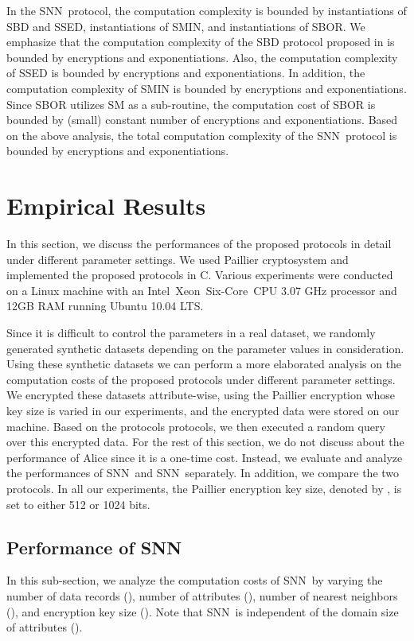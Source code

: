 \documentclass{article}
\newcommand{\sknnb}{SNN}
\newcommand{\sknnm}{SNN}
\begin{document}
In the \sknnm~protocol, the computation complexity is bounded by  
instantiations of SBD and SSED,  instantiations of SMIN, and  instantiations 
of SBOR. We emphasize that the computation complexity of the SBD protocol 
proposed in \cite{bksam-asiaccs13} is bounded by  encryptions and  exponentiations. 
Also, the computation complexity of SSED is bounded by  encryptions and  exponentiations. In 
addition, the computation complexity of SMIN is bounded by  encryptions 
and  exponentiations. Since SBOR utilizes SM as a sub-routine, 
the computation cost of SBOR is bounded by (small) constant number of encryptions and exponentiations. 
Based on the above analysis, the total computation complexity of the \sknnm~protocol 
is bounded by  
encryptions and exponentiations.
 

\section{Empirical Results} \label{sec:exp}
In this section, we discuss the  
performances of the proposed protocols in detail under different parameter settings. 
We used Paillier cryptosystem\cite{paillier-99} 
and implemented the proposed protocols in C. Various experiments 
were conducted on a Linux machine with an 
Intel\textregistered~Xeon\textregistered~Six-Core\texttrademark~CPU 3.07 GHz 
processor and 12GB RAM running Ubuntu 10.04 LTS. 


Since it is difficult to control the parameters in a real dataset, 
we randomly generated synthetic datasets depending on the parameter values in consideration. 
Using these synthetic datasets we can  
perform a more elaborated analysis on the computation costs of the proposed protocols under different 
parameter settings. 
We encrypted these datasets attribute-wise, using the Paillier encryption 
whose key size is varied in our experiments, and the encrypted data were
stored on our machine. Based on the protocols protocols, we then 
executed a random query over this encrypted data. For the rest 
of this section, we do not discuss about the performance of Alice 
since it is a one-time cost. Instead, we evaluate 
and analyze the performances of \sknnb~and \sknnm~separately. In addition, 
we compare the two protocols. In all our experiments, the Paillier 
encryption key size, denoted by , is set to either 512 or 1024 bits.


\subsection{Performance of \sknnb} 
In this sub-section, we analyze the computation costs of \sknnb~by 
varying the number of data records (), number of 
attributes (), number of nearest neighbors (), and encryption key size (). Note 
that \sknnb~is independent of the domain size of attributes (). 
\end{document}
